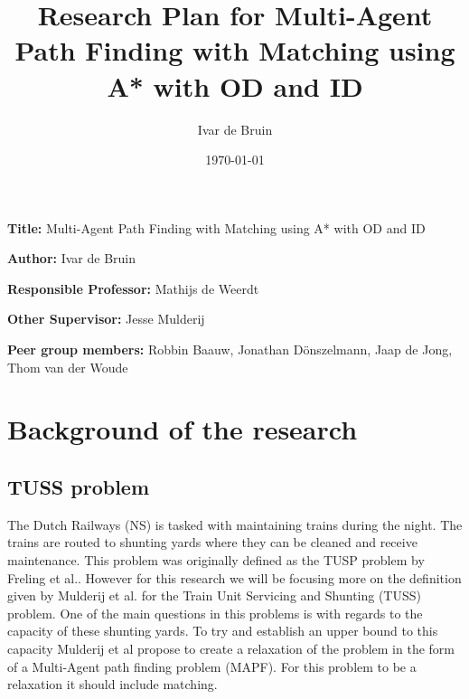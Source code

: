 \documentclass[english]{article}
\title{Research Plan for Multi-Agent Path Finding with Matching using A* with OD and ID}
\author{Ivar de Bruin}
\date{\today}
\newcommand{\namelistlabel}[1]{\mbox{#1}\hfil}
\newenvironment{namelist}[1]{%
\begin{list}{}
    {
        \let\makelabel\namelistlabel
        \settowidth{\labelwidth}{#1}
        \setlength{\leftmargin}{1.1\labelwidth}
    }
  }{%
\end{list}}
\begin{document}
\maketitle

\begin{namelist}{xxxxxxxxxxxxxxxxxxxxxxxxxxxxxxxxxxxxxxx}
\item[{\bf Title:}]
	Multi-Agent Path Finding with Matching using A* with OD and ID
\item[{\bf Author:}]
	Ivar de Bruin
\item[{\bf Responsible Professor:}]
	Mathijs de Weerdt
\item[{\bf Other Supervisor:}]
	Jesse Mulderij
\item[{\bf Peer group members:}]
	Robbin Baauw, Jonathan D\"onszelmann, Jaap de Jong, Thom van der Woude
\end{namelist}

\tableofcontents

\section{Background of the research}
\subsection{TUSS problem}
The Dutch Railways (NS) is tasked with maintaining trains during the night. 
The trains are routed to shunting yards where they can be cleaned and receive maintenance.
This problem was originally defined as the TUSP problem by Freling et al.\cite{freling2005TUSP}.
However for this research we will be focusing more on the definition given by Mulderij et al. \cite{mulderij2020train} for the Train Unit Servicing and Shunting (TUSS) problem.
One of the main questions in this problems is with regards to the capacity of these shunting yards. 
To try and establish an upper bound to this capacity Mulderij et al propose to create a relaxation of the problem in the form of a Multi-Agent path finding problem (MAPF). 
For this problem to be a relaxation it should include matching\cite{mulderij2020train}.
\end{document}
